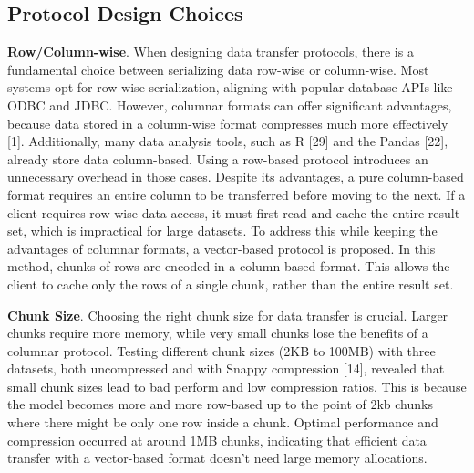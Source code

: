 \documentclass[sigconf]{acmart}
\begin{document}
\subsection{Protocol Design Choices}
\textbf{Row/Column-wise}. 
When designing data transfer protocols, there is a fundamental choice between serializing data row-wise or column-wise. Most systems opt for row-wise serialization, aligning with popular database APIs like ODBC and JDBC. However, columnar formats can offer significant advantages, because data stored in a column-wise format compresses much more effectively [1]. Additionally, many data analysis tools, such as R [29] and the Pandas [22], already store data column-based. Using a row-based protocol introduces an unnecessary overhead in those cases.
Despite its advantages, a pure column-based format requires an entire column to be transferred before moving to the next. If a client requires row-wise data access, it must first read and cache the entire result set, which is impractical for large datasets.
To address this while keeping the advantages of columnar formats, a vector-based protocol is proposed. In this method, chunks of rows are encoded in a column-based format. This allows the client to cache only the rows of a single chunk, rather than the entire result set.

\textbf{Chunk Size}.
Choosing the right chunk size for data transfer is crucial. Larger chunks require more memory, while very small chunks lose the benefits of a columnar protocol. Testing different chunk sizes (2KB to 100MB) with three datasets, both uncompressed and with Snappy compression [14], revealed that small chunk sizes lead to bad perform and low compression ratios. This is because the model becomes more and more row-based up to the point of 2kb chunks where there might be only one row inside a chunk. Optimal performance and compression occurred at around 1MB chunks, indicating that efficient data transfer with a vector-based format doesn't need large memory allocations.
\end{document}
